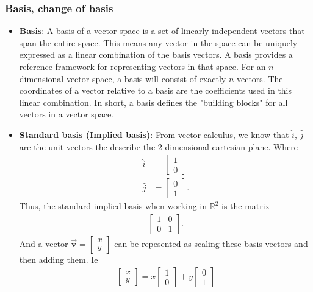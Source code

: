 \documentclass{report}
\begin{document}
    \subsubsection{Basis, change of basis}
    \begin{itemize}
        \item \textbf{Basis}: A basis of a vector space is a set of linearly independent vectors that span the entire space. This means any vector in the space can be uniquely expressed as a linear combination of the basis vectors. A basis provides a reference framework for representing vectors in that space.
            \bigbreak \noindent 
            For an $n$-dimensional vector space, a basis will consist of exactly $n$ vectors. The coordinates of a vector relative to a basis are the coefficients used in this linear combination.
            \bigbreak \noindent 
            In short, a basis defines the "building blocks" for all vectors in a vector space.
        \item \textbf{Standard basis (Implied basis)}: From vector calculus, we know that $\hat{i}$, $\hat{j}$ are the unit vectors the describe the 2 dimensional cartesian plane. Where
            \begin{align*}
                \hat{i} &= \begin{bmatrix} 1 \\ 0 \end{bmatrix} \\
                \hat{j} &= \begin{bmatrix} 0 \\ 1 \end{bmatrix}
            .\end{align*}
            Thus, the standard implied basis when working in $\mathbb{R}^{2}$ is the matrix
            \begin{align*}
                \begin{bmatrix} 1 & 0 \\ 0 & 1\end{bmatrix}
            .\end{align*}
            And a vector $\vec{\mathbf{v}} = \begin{bmatrix} x \\ y \end{bmatrix} $ can be repesented as scaling these basis vectors and then adding them. Ie
            \begin{align*}
                \begin{bmatrix} x \\ y \end{bmatrix} = x \begin{bmatrix} 1 \\ 0\end{bmatrix} + y \begin{bmatrix} 0 \\ 1 \end{bmatrix}

\end{align*}
\end{itemize}
\end{document}
